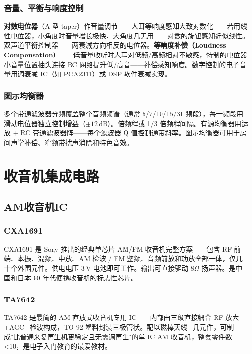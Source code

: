 \documentclass[12pt,UTF8]{ctexbook}
\begin{document}
\subsection{音量、平衡与响度控制}

\textbf{对数电位器}（A 型 taper）作音量调节——人耳等响度感知大致对数化——若用线性电位器，小角度时音量增长极快、大角度几无用——对数的旋钮感知近似线性。双声道平衡控制器——两衰减方向相反的电位器。\textbf{等响度补偿（Loudness Compensation）}——低音量收听时人耳对低频/高频相对不敏感，特制的电位器小音量位置抽头连接 RC 网络提升低/高音——补偿感知响度。数字控制的电子音量用调衰减 IC（如 PGA2311）或 DSP 软件衰减实现。

\subsection{图示均衡器}

多个带通滤波器分频覆盖整个音频频谱（通常 5/7/10/15/31 频段），每一频段用滑动电位器独立控制增益（$\pm12\,\mathrm{dB}$）。倍频程或 1/3 倍频程间隔。有源均衡器用运放 + RC 带通滤波器阵——每个滤波器 Q 值控制通带斜率。图示均衡器可用于房间声学补偿、窄频带扰声消除和特色音效。

\chapter{收音机集成电路}
\label{chap:radio_ic}

\section{AM收音机IC}
\label{sec:am_radio_ic}

\subsection{CXA1691}

CXA1691 是 Sony 推出的经典单芯片 AM/FM 收音机完整方案——包含 RF 前端、本振、混频、中放、AM 检波 / FM 鉴频、音频前放和功放全部一体，仅几十个外围元件。供电电压 $3\,\mathrm{V}$ 电池即可工作。输出可直接驱动 $8\Omega$ 扬声器。是中国和日本 90 年代便携收音机的标志性芯片。

\subsection{TA7642}

TA7642 是最简的 AM 直放式收音机专用 IC——内部由三级直接耦合 RF 放大+AGC+检波构成，TO-92 塑料封装三极管状。配以磁棒天线+几元件，可制成"比普通来复再生机更稳定且无需调再生"的单 IC AM 收音机，整套零件数 <10，是电子入门教育的最爱教材。
\end{document}
